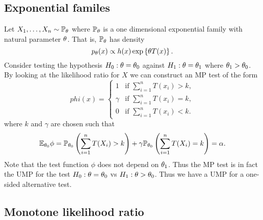 \subsection{Exponential familes}
Let $X_1,\ldots, X_n \sim {\mathbb{P}}_{\theta}$ where ${\mathbb{P}}_{\theta}$ is a one dimensional exponential family with natural parameter ${\theta}$. That is, ${\mathbb{P}}_{\theta}$ has density
\[p_{\theta}(x) \propto h(x)\exp\left\{{\theta} T(x)\right\}. \]
Consider testing the hypothesis $H_0:{\theta}={\theta}_0$ against $H_1 : {\theta} = {\theta}_1$ where ${\theta}_1 > {\theta}_0$. By looking at the likelihood ratio for $X$ we can construct an MP test of the form 
\[phi(x) = \begin{cases}
    1 & \text{if } \sum_{i=1}^n T(x_i) > k,\\
    \gamma & \text{if } \sum_{i=1}^n T(x_i) = k,\\
    0 & \text{if } \sum_{i=1}^n T(x_i) < k.
\end{cases}\]
where $k$ and $\gamma$ are chosen such that
\[{\mathbb{E}}_{{\theta}_0}\phi = {\mathbb{P}}_{{\theta}_0}\left(\sum_{i=1}^n T(X_i)> k\right) +\gamma {\mathbb{P}}_{{\theta}_0}\left(\sum_{i=1}^n T(X_i) = k\right)={\alpha}.\]
Note that the test function $\phi$ does not depend on ${\theta}_1$. Thus the MP test is in fact the UMP for the test $H_0 : {\theta} = {\theta}_0$ vs $H_1 : {\theta} > {\theta}_0$. Thus we have a UMP for a one-sided alternative test.
\subsection{Monotone likelihood ratio}

